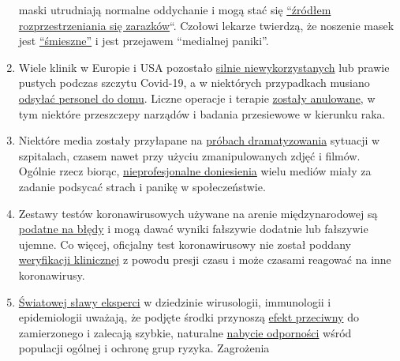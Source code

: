 \begin{enumerate}
  maski utrudniają normalne oddychanie i mogą stać się
  \href{https://de.sputniknews.com/interviews/20200425326953541-corona-gefahr-virologe/}{``źródłem
  rozprzestrzeniania się zarazków}``. Czołowi lekarze twierdzą, że
  noszenie masek jest
  \href{https://www.aerztezeitung.de/Politik/Montgomery-haelt-Maskenpflicht-fuer-falsch-408844.html}{``śmieszne''}
  i jest przejawem ``medialnej paniki''.
\item
  Wiele klinik w Europie i USA pozostało
  \href{https://www.hsj.co.uk/acute-care/nhs-hospitals-have-four-times-more-empty-beds-than-normal/7027392.article}{silnie
  niewykorzystanych} lub prawie pustych podczas szczytu Covid-19, a w
  niektórych przypadkach musiano
  \href{https://www.usatoday.com/story/news/health/2020/04/02/coronavirus-pandemic-jobs-us-health-care-workers-furloughed-laid-off/5102320002/}{odsyłać
  personel do domu}. Liczne operacje i terapie
  \href{https://www.sfchronicle.com/bayarea/article/Stanford-hospital-system-to-cut-pay-20-furlough-15227591.php}{zostały
  anulowane}, w tym niektóre przeszczepy narządów i badania przesiewowe
  w kierunku raka.
\item
  Niektóre media zostały przyłapane na
  \href{https://nypost.com/2020/04/01/cbs-admits-to-using-footage-from-italy-in-report-about-nyc/}{próbach
  dramatyzowania} sytuacji w szpitalach, czasem nawet przy użyciu
  zmanipulowanych zdjęć i filmów. Ogólnie rzecz biorąc,
  \href{https://onlinelibrary.wiley.com/doi/full/10.1111/eci.13222}{nieprofesjonalne
  doniesienia} wielu mediów miały za zadanie podsycać strach i panikę w
  społeczeństwie.
\item
  Zestawy testów koronawirusowych używane na arenie międzynarodowej są
  \href{https://www.ncbi.nlm.nih.gov/pubmed/32219885}{podatne na błędy}
  i mogą dawać wyniki fałszywie dodatnie lub fałszywie ujemne. Co
  więcej, oficjalny test koronawirusowy nie został poddany
  \href{https://www.youtube.com/watch?v=p_AyuhbnPOI}{weryfikacji
  klinicznej} z powodu presji czasu i może czasami reagować na inne
  koronawirusy.
\item
  \href{https://off-guardian.org/2020/03/24/12-experts-questioning-the-coronavirus-panic/}{Światowej
  sławy eksperci} w dziedzinie wirusologii, immunologii i epidemiologii
  uważają, że podjęte środki przynoszą
  \href{https://off-guardian.org/2020/03/28/10-more-experts-criticising-the-coronavirus-panic/}{efekt
  przeciwny} do zamierzonego i zalecają szybkie, naturalne
  \href{https://off-guardian.org/2020/04/17/8-more-experts-questioning-the-coronavirus-panic/}{nabycie
  odporności} wśród populacji ogólnej i ochronę grup ryzyka. Zagrożenia

\end{enumerate}
